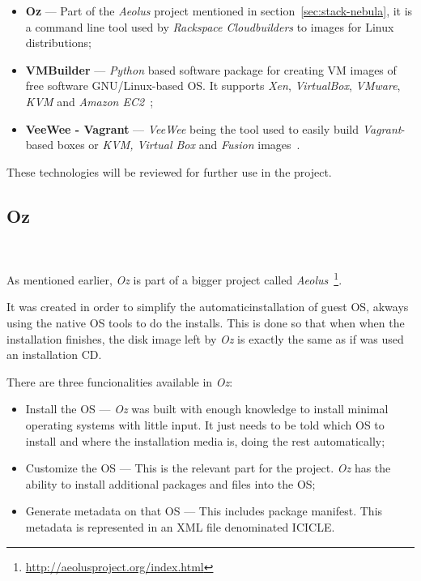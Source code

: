 \begin{itemize}
\item \textbf{Oz} --- Part of the \textit{Aeolus} project mentioned in section~\ref{sec:stack-nebula}, it is a command line tool used by \textit{Rackspace Cloudbuilders} to images for Linux distributions;
\item \textbf{VMBuilder} --- \textit{Python} based software package for creating VM images of free software GNU/Linux-based OS. It supports \textit{Xen}, \textit{VirtualBox}, \textit{VMware}, \textit{KVM} and \textit{Amazon EC2}~\cite{vmbuilder};
\item \textbf{VeeWee - Vagrant} --- \textit{VeeWee} being the tool used to easily build \textit{Vagrant}-based boxes or \textit{KVM, Virtual Box} and \textit{Fusion} images~\cite{essex-doc-vms,veewee}.
\end{itemize}

These technologies will be reviewed for further use in the project.

\subsection{Oz}~\label{subsec:oz}

As mentioned earlier, \textit{Oz} is part of a bigger project called \textit{Aeolus}~\footnote{\url{http://aeolusproject.org/index.html}}.

It was created in order to simplify the automaticinstallation of guest OS, akways using the native OS tools to do the installs. This is done so that when when the installation finishes, the disk image left by \textit{Oz} is exactly the same as if was used an installation CD. 

There are three funcionalities available in \textit{Oz}:

\begin{itemize}
\item Install the OS --- \textit{Oz} was built with enough knowledge to install minimal operating systems with little input. It just needs to be told which OS to install and where the installation media is, doing the rest automatically;
\item Customize the OS --- This is the relevant part for the project. \textit{Oz} has the ability to install additional packages and files into the OS;
\item Generate metadata on that OS --- This includes package manifest. This metadata is represented in an XML file denominated ICICLE.
\end{itemize}

